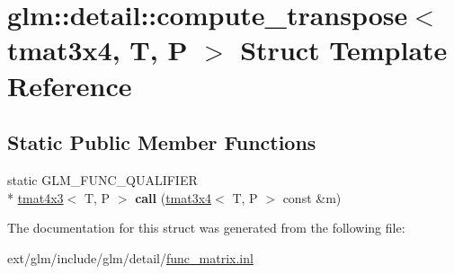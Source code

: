\hypertarget{structglm_1_1detail_1_1compute__transpose_3_01tmat3x4_00_01_t_00_01_p_01_4}{\section{glm\-:\-:detail\-:\-:compute\-\_\-transpose$<$ tmat3x4, T, P $>$ Struct Template Reference}
\label{structglm_1_1detail_1_1compute__transpose_3_01tmat3x4_00_01_t_00_01_p_01_4}
}
\subsection*{Static Public Member Functions}
\begin{DoxyCompactItemize}
\item 
\hypertarget{structglm_1_1detail_1_1compute__transpose_3_01tmat3x4_00_01_t_00_01_p_01_4_a62f5b6aa47fa96ba744c118e937525c0}{static G\-L\-M\-\_\-\-F\-U\-N\-C\-\_\-\-Q\-U\-A\-L\-I\-F\-I\-E\-R \\*
\hyperlink{structglm_1_1tmat4x3}{tmat4x3}$<$ T, P $>$ {\bfseries call} (\hyperlink{structglm_1_1tmat3x4}{tmat3x4}$<$ T, P $>$ const \&m)}\label{structglm_1_1detail_1_1compute__transpose_3_01tmat3x4_00_01_t_00_01_p_01_4_a62f5b6aa47fa96ba744c118e937525c0}

\end{DoxyCompactItemize}


The documentation for this struct was generated from the following file\-:\begin{DoxyCompactItemize}
\item 
ext/glm/include/glm/detail/\hyperlink{func__matrix_8inl}{func\-\_\-matrix.\-inl}\end{DoxyCompactItemize}
